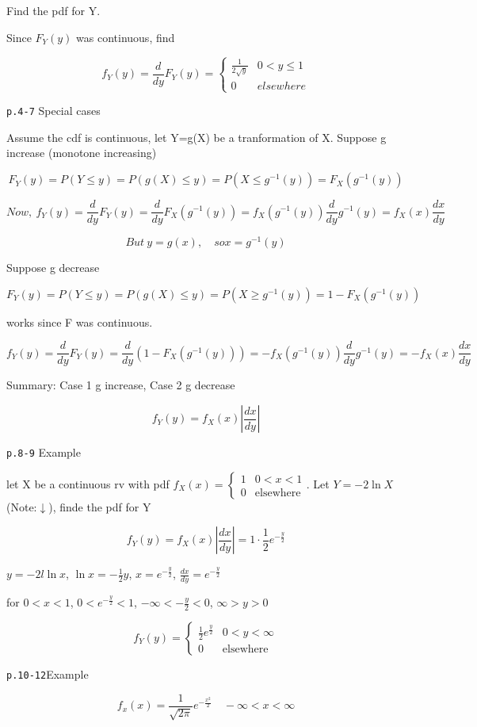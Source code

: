 \documentclass[]{tufte-book}
\begin{document}
Find the pdf for Y.

Since \(F_Y(y)\) was continuous, find

\[f_Y(y)=\frac{d}{dy}F_Y(y)=\begin{cases}\frac1{2\sqrt y} &0< y\le1\\0 &elsewhere\end{cases}\]

\texttt{p.4-7} Special cases

Assume the cdf is continuous, let Y=g(X) be a tranformation of X.
Suppose g increase (monotone increasing)

\[F_Y(y)=P(Y\le y)=P(g(X)\le y)=P(X\le g^{-1}(y))=F_X(g^{-1}(y))\]

\[Now,\ f_Y(y)=\frac{d}{dy}F_Y(y)=\frac{d}{dy}F_X(g^{-1}(y))=f_X(g^{-1}(y))\frac{d}{dy}g^{-1}(y)=f_X(x)\frac{dx}{dy}\]

\[But\ y=g(x),\quad so x=g^{-1}(y)\]

Suppose g decrease

\[F_Y(y)=P(Y\le y)=P(g(X)\le y)=P(X\ge g^{-1}(y))=1-F_X(g^{-1}(y))\]

works since F was continuous.

\[f_Y(y)=\frac{d}{dy}F_Y(y)=\frac{d}{dy}(1-F_X(g^{-1}(y)))=-f_X(g^{-1}(y))\frac{d}{dy}g^{-1}(y)=-f_X(x)\frac{dx}{dy}\]

Summary: Case 1 g increase, Case 2 g decrease

\[f_Y(y)=f_X(x)|\frac{dx}{dy}|\]

\texttt{p.8-9} Example

let X be a continuous rv with pdf
\(f_X(x)=\begin{cases}1 &0<x<1\\0 &\text{elsewhere}\end{cases}\). Let
\(Y=-2\ln X\) (Note:\(\downarrow\)), finde the pdf for Y

\[f_Y(y)=f_X(x)|\frac{dx}{dy}|=1\cdot\frac12e^{-\frac{y}2}\]

\(y=-2l\ln x\), \(\ln x=-\frac12y\), \(x=e^{-\frac{y}2}\),
\(\frac{dx}{dy}=e^{-\frac{y}2}\)

for \(0<x<1\), \(0<e^{-\frac{y}2}<1\), \(-\infty<-\frac{y}2<0\),
\(\infty>y>0\)

\[f_Y(y)=\begin{cases}\frac12e^{\frac{y}2} &0<y<\infty\\0 &\text{elsewhere}\end{cases}\]

\texttt{p.10-12}Example

\[f_x(x)=\frac1{\sqrt{2\pi}}e^{-\frac{x^2}2}\quad -\infty<x<\infty\]
\end{document}
